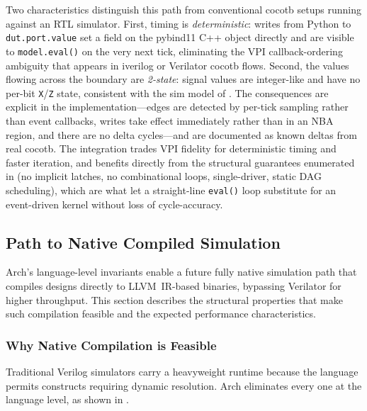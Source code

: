 \documentclass[11pt,twocolumn]{article}
\begin{document}
Two characteristics distinguish this path from conventional cocotb setups running against an RTL simulator. First, timing is \emph{deterministic}: writes from Python to \texttt{dut.port.value} set a field on the pybind11 C++ object directly and are visible to \texttt{model.eval()} on the very next tick, eliminating the VPI callback-ordering ambiguity that appears in iverilog or Verilator cocotb flows. Second, the values flowing across the boundary are \emph{2-state}: signal values are integer-like and have no per-bit \texttt{X}/\texttt{Z} state, consistent with the sim model of . The consequences are explicit in the implementation---edges are detected by per-tick sampling rather than event callbacks, writes take effect immediately rather than in an NBA region, and there are no delta cycles---and are documented as known deltas from real cocotb. The integration trades VPI fidelity for deterministic timing and faster iteration, and benefits directly from the structural guarantees enumerated in  (no implicit latches, no combinational loops, single-driver, static DAG scheduling), which are what let a straight-line \texttt{eval()} loop substitute for an event-driven kernel without loss of cycle-accuracy.

\subsection{Path to Native Compiled Simulation}

Arch's language-level invariants enable a future fully native simulation path that compiles designs directly to LLVM~IR-based binaries, bypassing Verilator for higher throughput. This section describes the structural properties that make such compilation feasible and the expected performance characteristics.

\subsubsection{Why Native Compilation is Feasible}

Traditional Verilog simulators carry a heavyweight runtime because the language permits constructs requiring dynamic resolution. Arch eliminates every one at the language level, as shown in .
\end{document}
